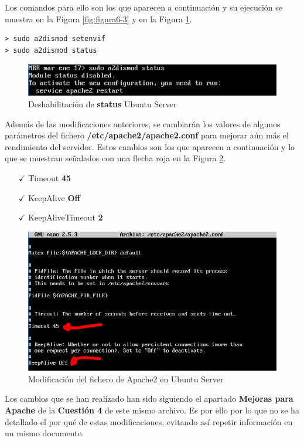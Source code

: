 \vspace{-10pt}
Los comandos para ello son los que aparecen a continuación y su ejecución se muestra en la Figura \ref{fig:figura6-3} y en la Figura \ref{fig:figura6-4}.
\begin{lstlisting}[style=fich]
> sudo a2dismod setenvif
> sudo a2dismod status
\end{lstlisting}
\begin{figure}[H] %
	\centering
	\includegraphics[scale=0.9]{figuras/ejercicio6/figura6-4.png} 
	\caption{Deshabilitación de \textbf{status} Ubuntu Server} 
	\label{fig:figura6-4}
\end{figure}

Además de las modificaciones anteriores, se cambiarán los valores de algunos parámetros del fichero \textbf{/etc/apache2/apache2.conf} para mejorar aún más el rendimiento del servidor.
Estos cambios son los que aparecen a continuación y lo que se muestran señalados con una flecha roja en la Figura \ref{fig:figura6-5}.
\begin{itemize}
	\item [$ \checkmark $] Timeout \textbf{45}
		\item [$ \checkmark $] KeepAlive \textbf{Off}
			\item [$ \checkmark $] KeepAliveTimeout \textbf{2}
\end{itemize}

\begin{figure}[H] %
	\centering
	\includegraphics[scale=0.9]{figuras/ejercicio6/figura6-5.png} 
	\caption{Modificación del fichero de Apache2 en Ubuntu Server} 
	\label{fig:figura6-5}
\end{figure}
Los cambios que se han realizado han sido siguiendo el apartado \textbf{Mejoras para Apache} de la \textbf{Cuestión 4} de este mismo archivo. Es por ello por lo que no se ha detallado el por qué de estas modificaciones, evitando así repetir información en un mismo documento.
